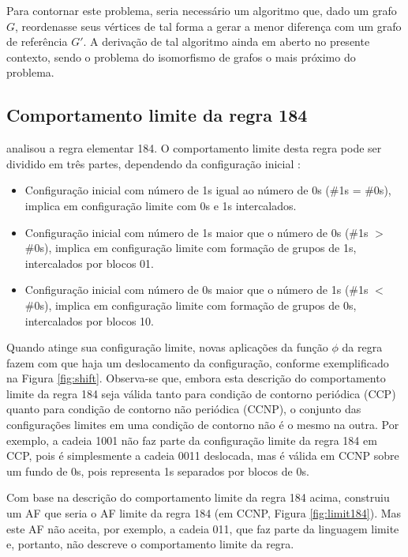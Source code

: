 \documentclass[12pt,a4paper]{article}
\begin{document}
Para contornar este problema, seria necessário um algoritmo que, dado
um grafo $G$, reordenasse seus vértices de tal forma a gerar a menor
diferença com um grafo de referência $G'$. A derivação de tal algoritmo
ainda em aberto no presente contexto, sendo o problema do isomorfismo de grafos o mais
próximo do problema.

\subsection{Comportamento limite da regra 184}\label{sec:limit184}

 analisou a regra elementar 184. O comportamento
limite desta regra pode ser dividido em três partes, dependendo da
configuração inicial :

\begin{itemize}
\item Configuração inicial com número de 1s igual ao número de 0s
(\#1s = \#0s), implica em configuração limite com 0s e 1s
intercalados.

\item Configuração inicial com número de 1s maior que o número de 0s
(\#1s $>$ \#0s), implica em configuração limite com formação de grupos de
1s, intercalados por blocos 01.

\item Configuração inicial com número de 0s maior que o número de 1s
(\#1s $<$ \#0s), implica em configuração limite com formação de grupos
de 0s, intercalados por blocos 10.
\end{itemize}

Quando atinge sua configuração limite, novas aplicações da função
$\phi$ da regra fazem com que haja um deslocamento da configuração,
conforme exemplificado na Figura \ref{fig:shift}.
Observa-se que, embora esta descrição do comportamento limite da regra
184 seja válida tanto para condição de contorno periódica (CCP) quanto
para condição de contorno não periódica (CCNP), o conjunto das
configurações limites em uma condição de contorno
não é o mesmo na outra. Por exemplo, a cadeia 1001 não faz parte
da configuração limite da regra 184 em CCP, pois é simplesmente a
cadeia 0011 deslocada, mas é válida em CCNP sobre um fundo de 0s, pois
representa 1s separados por blocos de 0s.

Com base na descrição do comportamento limite da regra 184 acima,
 construiu um AF que seria
o AF limite da regra 184 (em CCNP, Figura \ref{fig:limit184}). Mas este AF não
aceita, por exemplo, a cadeia 011, que faz parte da linguagem limite e,
portanto, não descreve o comportamento limite da regra.
\end{document}
